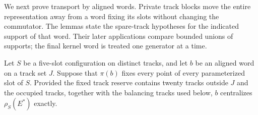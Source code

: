 We next prove transport by aligned words.  Private track blocks move
the entire representation away from a word fixing its slots without
changing the commutator.  The lemmas state the spare-track hypotheses
for the indicated support of that word.  Their later applications
compare bounded unions of supports; the final kernel word is treated
one generator at a time.

\begin{lemma}\label{lem:fixed-slot-centralizer}
Let $S$ be a five-slot configuration on distinct tracks, and let $b$ be
an aligned word on a track set $J$.  Suppose that $\pi(b)$ fixes every
point of every parameterized slot of $S$.  Provided the fixed track
reserve contains twenty tracks outside $J$ and the occupied tracks,
together with the balancing tracks used below, $b$ centralizes
$\rho_S(E^\ast)$ exactly.
\end{lemma}

